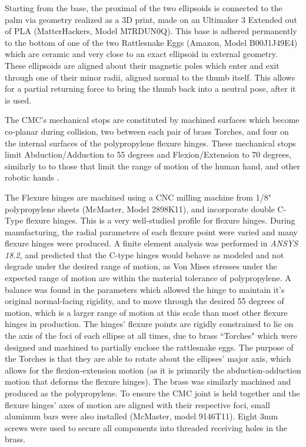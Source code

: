 \documentclass[letterpaper, 10 pt, conference]{ieeeconf}
\begin{document}
 Starting from the base, the proximal of the two ellipsoids is connected to the palm via geometry realized as a 3D print, made on an Ultimaker 3 Extended out of PLA (MatterHackers, Model M7RDUN0Q). This base is adhered permanently to the bottom of one of the two Rattlesnake Eggs (Amazon, Model B00J1J49E4) which are ceramic and very close to an exact ellipsoid in external geometry. These ellipsoids are aligned about their magnetic poles which enter and exit through one of their minor radii, aligned normal to the thumb itself. This allows for a partial returning force to bring the thumb back into a neutral pose, after it is used.
 
 The CMC's mechanical stops are constituted by machined surfaces which become co-planar during collision, two between each pair of brass Torches, and four on the internal surfaces of the polypropylene flexure hinges. These mechanical stops limit Abduction/Adduction to 55 degrees and Flexion/Extension to 70 degrees, similarly to to those that limit the range of motion of the human hand, and other robotic hands \cite{santos2006reported} \cite{fff}.
 
 The Flexure hinges are machined using a CNC milling machine from 1/8" polypropylene sheets (McMaster, Model 2898K11), and incorporate double C-Type flexure hinges. This is a very well-studied profile for flexure hinges. During manufacturing, the radial parameters of each flexure point were varied and many flexure hinges were produced. A finite element analysis was performed in \textit{ANSYS 18.2}, and predicted that the C-type hinges would behave as modeled and not degrade under the desired range of motion, as Von Mises stresses under the expected range of motion are within the material tolerance of polypropylene. A balance was found in the parameters which allowed the hinge to maintain it's original normal-facing rigidity, and to move through the desired 55 degrees of motion, which is a larger range of motion at this scale than most other flexure hinges in production. The hinges' flexure points are rigidly constrained to lie on the axis of the foci of each ellipse at all times, due to brass ``Torches" which were designed and machined to partially enclose the rattlesnake eggs. The purpose of the Torches is that they are able to rotate about the ellipses' major axis, which allows for the flexion-extension motion (as it is primarily the abduction-adduction motion that deforms the flexure hinges). The brass was similarly machined and produced as the polypropylene. To ensure the CMC joint is held together and the flexure hinges' axes of motion are aligned with their respective foci, small aluminum bars were also installed (McMaster, model 9146T11). Eight 3mm screws were used to secure all components into threaded receiving holes in the brass.
 
\end{document}
